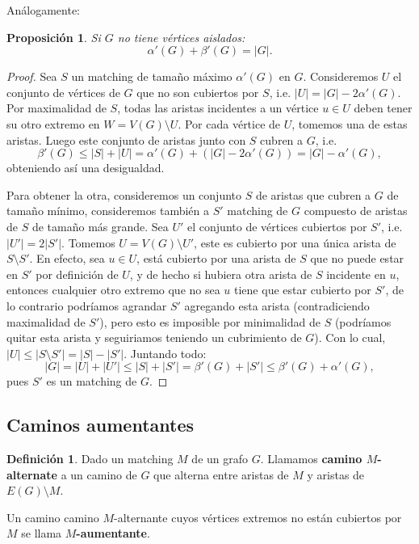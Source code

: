\documentclass[12pt]{report}
\theoremstyle{plain}
\newtheorem{proposition}[theorem]{Proposición}
\theoremstyle{definition}
\newtheorem{definition}[theorem]{Definición}
\newcommand{\abs}[1]{\left \vert #1 \right \vert}
\begin{document}
Análogamente:
\begin{proposition}
Si $G$ no tiene vértices aislados:
\[
\boxed{\alpha ' (G) + \beta ' (G) = \abs G .}
\]
\end{proposition}
\begin{proof}
Sea $S$ un matching de tamaño máximo $\alpha ' (G)$ en $G$. Consideremos $U$ el conjunto de vértices de $G$ que no son cubiertos por $S$, i.e. $\abs U = \abs G - 2 \alpha ' (G)$. Por maximalidad de $S$, todas las aristas incidentes a un vértice $u \in U$ deben tener su otro extremo en $W = V(G) \setminus U$. Por cada vértice de $U$, tomemos una de estas aristas. Luego este conjunto de aristas junto con $S$ cubren a $G$, i.e.
\[
\beta ' (G) \leq \abs S + \abs U = \alpha ' (G) + (\abs G - 2 \alpha ' (G)) = \abs G - \alpha ' (G),
\]
obteniendo así una desigualdad.

Para obtener la otra, consideremos un conjunto $S$ de aristas que cubren a $G$ de tamaño mínimo, consideremos también a $S'$ matching de $G$ compuesto de aristas de $S$ de tamaño más grande. Sea $U'$ el conjunto de vértices cubiertos por $S'$, i.e. $\abs {U'} = 2 \abs {S'}$. Tomemos $U = V(G) \setminus U'$, este es cubierto por una única arista de $S \setminus S'$. En efecto, sea $u \in U$, está cubierto por una arista de $S$ que no puede estar en $S'$ por definición de $U$, y de hecho si hubiera otra arista de $S$ incidente en $u$, entonces cualquier otro extremo que no sea $u$ tiene que estar cubierto por $S'$, de lo contrario podríamos agrandar $S'$ agregando esta arista (contradiciendo maximalidad de $S'$), pero esto es imposible por minimalidad de $S$ (podríamos quitar esta arista y seguiriamos teniendo un cubrimiento de $G$). Con lo cual, $\abs {U} \leq \abs {S \setminus S'} = \abs S - \abs {S'}$. Juntando todo:
\[
\abs G = \abs U + \abs {U'} \leq \abs S + \abs {S'} = \beta ' (G) + \abs {S'} \leq \beta ' (G) + \alpha ' (G),
\]
pues $S'$ es un matching de $G$.
\end{proof}



\subsection{Caminos aumentantes}


\begin{definition}
Dado un matching $M$ de un grafo $G$. Llamamos \textbf{camino $M$-alternate} a un camino de $G$ que alterna entre aristas de $M$ y aristas de $E(G) \setminus M$.

Un camino camino $M$-alternante cuyos vértices extremos no están cubiertos por $M$ se llama \textbf{$M$-aumentante}.
\end{definition}
\end{document}
